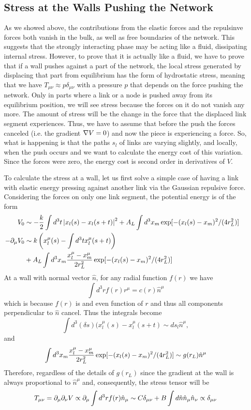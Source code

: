 \documentclass[nofootinbib,preprint,floatfix,titlepage,endfloats,superscriptaddress]{revtex4} %
\begin{document}
\subsection{Stress at the Walls Pushing the Network}
As we showed above, the contributions from the elastic forces and the repulsinve forces both vanish in the bulk, as well as free boundaries of the network. This suggests that the strongly interacting phase may be acting like a fluid, dissipating internal stress. 
However, to prove that it is actually like a fluid, we have to prove that if a wall pushes against a part of the network, the local stress generated by displacing that part from equilibrium has the form of hydrostatic stress, meaning that we have $T_{\mu\nu} \approx p \delta_{\mu\nu}$ with a pressure $p$ that depends on the force pushing the network. 
Only in parts where a link or a node is pushed away from its equilibrium position, we will see stress because the forces on it do not vanish any more.
The amount of stress will be the change in the force that the displaced link segment experiences.
Thus, we have to assume that before the push the forces canceled (i.e. the gradient $\nabla V = 0$) and now the piece is experiencing a force. 
So, what is happening is that the paths $s_l$ of links are varying slightly, and locally, when the push occurs and we want to calculate the energy cost of this variation.
Since the forces were zero, the energy cost is second order in derivatives of $V$. 

To calculate the stress at a wall, let us first solve a simple case of having a link with elastic energy pressing against another link via the Gaussian repulsive force. 
Considering the forces on only one link segment, the potential energy is of the form
\begin{align}
    V_0 &\sim -{k\over 2} \int d^3t \left|x_l(s)- x_l(s+t)\right|^2 + A_L \int d^3 x_m \exp[-(x_l(s) - x_m)^2/ (4r_L^2)]   \cr 
    -\partial_\mu V_0 & \sim k \left(x_l^\mu(s)- \int d^3t x^\mu_l(s+t)\right) \cr & + A_L \int d^3 x_m {x_l^\mu-x_m^\mu  \over 2r_L^2} \exp[-(x_l(s) - x_m)^2/ (4r_L^2)]
\end{align}
At a wall with normal vector $\hat{n}$, for any radial function $f(r)$ we have 
\[\int d^3 r f(r) r^\mu = c(r) \hat{n}^\mu \]
which is because $f(r) $ is and even function of $r$ and thus all components perpendicular to $\hat{n}$ cancel. 
Thus the integrals become 
\[\int d^3(\delta s) (x_l^\mu (s) - x^\mu_l(s+t) \sim ds_l\hat{n}^\mu,\]
and  
\[\int d^3 x_m {x_l^\mu-x_m^\mu  \over 2r_L^2} \exp[-(x_l(s) - x_m)^2/ (4r_L^2)] \sim g(r_L) \hat{n}^\mu  \]
Therefore, regardless of the details of $g(r_L)$ since the gradient at the wall is always proportional to $\hat{n}^\mu $ and, consequently, the stress tensor will be 
\[T_{\mu\nu} = \partial_\mu\partial_\nu V \propto \partial_\mu \int d^3r f(r)\hat{n}_\mu \sim C \delta_{\mu\nu} + B\int d\hat{n} \hat{n}_\mu \hat{n}_\nu \propto \delta_{\mu\nu} \]
\end{document}
